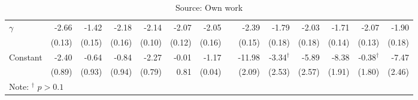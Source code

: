 \begin{table} [H]
\begin{tabular}{lrrrrrrrrrrrrr}
$\gamma$ & -2.66  & -1.42  & -2.18  & -2.14  & -2.07  & -2.05  && -2.39   & -1.79   & -2.03   & -1.71   & -2.07   & -1.90 \\ 
         & (0.13) & (0.15) & (0.16) & (0.10) & (0.12) & (0.16) && (0.15)  & (0.18)  & (0.18)  & (0.14)  & (0.13)  & (0.18) \\[0.07cm]
Constant & -2.40  & -0.64  & -0.84  & -2.27  & -0.01  & -1.17  && -11.98  & -3.34$^{\dagger}$   & -5.89   & -8.38   & -0.38$^{\dagger}$   & -7.47 \\ 
         & (0.89) & (0.93) & (0.94) & (0.79) & 0.81   & (0.04) && (2.09)  & (2.53)  & (2.57)  & (1.91)  & (1.80)  & (2.46) \\ 
\bottomrule
\multicolumn{3}{l}{Note: $^{\dagger}$ $p>0.1$}
\end{tabular}
\caption*{Source: Own work}
\end{table}
